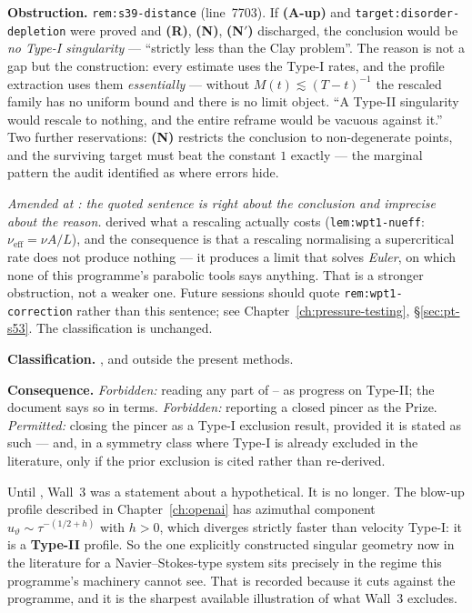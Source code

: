 \textbf{Obstruction.} \texttt{rem:s39-distance} (line~7703). If \textbf{(A-up)}
and \texttt{target:disorder-depletion} were proved and \textbf{(R)},
\textbf{(N)}, \textbf{(N\('\))} discharged, the conclusion would be \emph{no
Type-I singularity} --- ``strictly less than the Clay problem''. The reason is
not a gap but the construction: every estimate uses the Type-I rates, and the
profile extraction uses them \emph{essentially} --- without
\(M(t)\lesssim(T-t)^{-1}\) the rescaled family has no uniform bound and there
is no limit object. ``A Type-II singularity would rescale to nothing, and the
entire reframe would be vacuous against it.'' Two further reservations:
\textbf{(N)} restricts the conclusion to non-degenerate points, and the
surviving target must beat the constant \(1\) exactly --- the marginal pattern
the  audit identified as where errors hide.

\emph{Amended at : the quoted sentence is right about the conclusion and
imprecise about the reason.}  derived what a rescaling actually costs
(\texttt{lem:wpt1-nueff}: \(\nu_{\mathrm{eff}}=\nu A/L\)), and the consequence
is that a rescaling normalising a supercritical rate does not produce nothing
--- it produces a limit that solves \emph{Euler}, on which none of this
programme's parabolic tools says anything. That is a stronger obstruction, not
a weaker one. Future sessions should quote \texttt{rem:wpt1-correction} rather
than this sentence; see Chapter~\ref{ch:pressure-testing},
\S\ref{sec:pt-s53}. The classification is unchanged.

\textbf{Classification.} \OPEN{}, and outside the present methods.

\textbf{Consequence.} \emph{Forbidden:} reading any part of -- as
progress on Type-II; the document says so in terms. \emph{Forbidden:} reporting
a closed pincer as the Prize. \emph{Permitted:} closing the pincer as a Type-I
exclusion result, provided it is stated as such --- and, in a symmetry class
where Type-I is already excluded in the literature, only if the prior exclusion
is cited rather than re-derived.

\begin{obsv}
\label{obs:wall3-concrete}
Until , Wall~3 was a statement about a hypothetical. It is no longer.
The blow-up profile described in Chapter~\ref{ch:openai} has azimuthal
component \(u_\vartheta\sim\tau^{-(1/2+h)}\) with \(h>0\), which diverges
strictly faster than velocity Type-I: it is a \textbf{Type-II} profile. So the
one explicitly constructed singular geometry now in the literature for a
Navier--Stokes-type system sits precisely in the regime this programme's
machinery cannot see. That is recorded because it cuts against the programme,
and it is the sharpest available illustration of what Wall~3 excludes.
\end{obsv}

